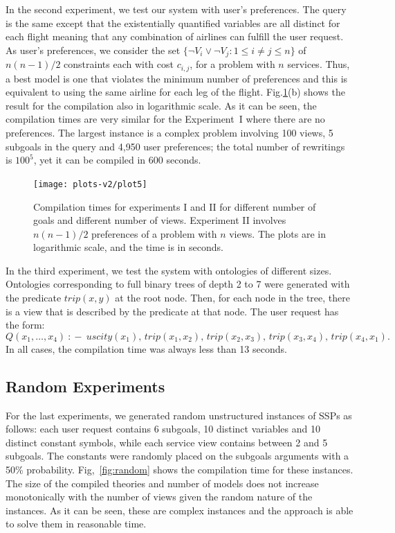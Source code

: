 \documentclass{llncs}
\newcommand{\qrule}{:\!\!-}
\newcommand{\trip}{\textit{trip}}
\newcommand{\UScity}{\textit{uscity}}
\begin{document}
In the second experiment, we test our system with user's preferences.
The query is the same except that the existentially quantified variables
are all distinct for each flight meaning that any combination of airlines
can fulfill the user request.
As user's preferences, we consider the set
$\{\neg V_i \lor \neg V_j : 1\leq i\neq j\leq n\}$ of $n(n-1)/2$ constraints
each with cost $c_{i,j}$, for a problem with $n$ services.
Thus, a best model is one that violates the minimum number of preferences
and this is equivalent to using the same airline
for each leg of the flight. Fig.\ref{fig:plot1}(b) shows the result for
the compilation also in logarithmic scale.
As it can be seen,  the compilation times are very similar for the
Experiment~I where there are no preferences.
The largest instance is a complex problem involving 100 views, 5 subgoals
in the query and 4,950 user preferences; the total number of rewritings
is $100^5$, yet it can be compiled in 600 seconds.

\begin{figure}[t]
\centering
\texttt{[image: plots-v2/plot5]}
\caption{Compilation times for experiments I and II for different
number of goals and different number of views.
Experiment II involves $n(n-1)/2$ preferences of a problem with $n$ views.
The plots are in logarithmic scale, and the time is in seconds.}
\label{fig:plot1}
\end{figure}

In the third experiment, we test the system with ontologies of different sizes.
Ontologies corresponding to full binary trees of depth 2 to 7 were generated with
the predicate $\trip(x,y)$ at the root node. Then, for each node in the tree,
there is a view that is described by the predicate at that node.
The user request has the form:
\[ Q(x_1,\ldots,x_4)\ \qrule\  \UScity(x_1),\,\trip(x_1,x_2),\,\trip(x_2,x_3),\,\trip(x_3,x_4),\,\trip(x_4,x_1).\]
In all cases, the compilation time was always less than 13 seconds.

\subsection{Random Experiments}

For the last experiments, we generated random unstructured instances of SSPs
as follows: each user request contains 6 subgoals, 10 distinct variables and
10 distinct constant symbols, while each service view contains between 2 and
5 subgoals. The constants were randomly placed on the subgoals arguments with
a 50\% probability.
Fig,~\ref{fig:random} shows the compilation time for these instances. 
The size of the compiled theories and number of models does not increase
monotonically with the number of views given the random nature of the
instances. As it can be seen, these are complex instances and the approach
is able to solve them in reasonable time.
\end{document}
